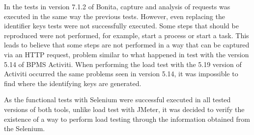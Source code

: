 \documentclass[runningheads,a4paper]{llncs}
\begin{document}
In the tests in version 7.1.2 of Bonita, capture and analysis of requests was executed in the same way the previous tests. However, even replacing the identifier keys tests were not successfully executed. Some steps that should be reproduced were not performed, for example, start a process or start a task. This leads to believe that some steps are not performed in a way that can be captured via an HTTP request, problem similar to what happened in test with the version 5.14 of BPMS Activiti. When performing the load test with the 5.19 version of Activiti occurred the same problems seen in version 5.14, it was impossible to find where the identifying keys are generated.


As the functional tests with Selenium were successful executed in all tested versions of both tools, 
unlike load test with JMeter, it was decided to verify the existence of a way to perform load testing through the information obtained from the Selenium. 
\end{document}
